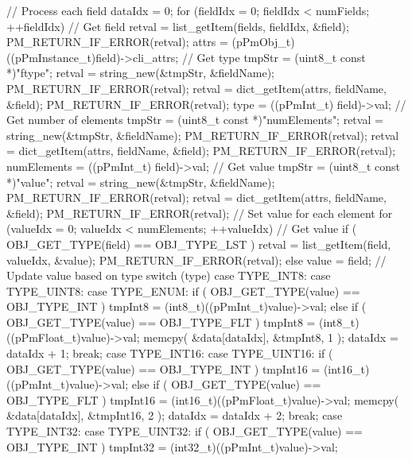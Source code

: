 \begin{DoxyVerb}
// Process each field
dataIdx = 0;
for (fieldIdx = 0; fieldIdx < numFields; ++fieldIdx)
{		
        // Get field
        retval = list_getItem(fields, fieldIdx, &field); PM_RETURN_IF_ERROR(retval);
        attrs = (pPmObj_t)((pPmInstance_t)field)->cli_attrs;
        // Get type
        tmpStr = (uint8_t const *)"ftype";
        retval = string_new(&tmpStr, &fieldName); PM_RETURN_IF_ERROR(retval); 
        retval = dict_getItem(attrs, fieldName, &field); PM_RETURN_IF_ERROR(retval);
        type = ((pPmInt_t) field)->val;   
        // Get number of elements
        tmpStr = (uint8_t const *)"numElements";
        retval = string_new(&tmpStr, &fieldName); PM_RETURN_IF_ERROR(retval); 
        retval = dict_getItem(attrs, fieldName, &field); PM_RETURN_IF_ERROR(retval);
        numElements = ((pPmInt_t) field)->val;
        // Get value
        tmpStr = (uint8_t const *)"value";
        retval = string_new(&tmpStr, &fieldName); PM_RETURN_IF_ERROR(retval); 
        retval = dict_getItem(attrs, fieldName, &field); PM_RETURN_IF_ERROR(retval); 
        // Set value for each element
        for (valueIdx = 0; valueIdx < numElements; ++valueIdx)
        {
// Get value
if ( OBJ_GET_TYPE(field) == OBJ_TYPE_LST )
{
        retval = list_getItem(field, valueIdx, &value); PM_RETURN_IF_ERROR(retval); 
}
else
        value = field;
// Update value based on type    
switch (type)  
{
        case TYPE_INT8: 
        case TYPE_UINT8:
        case TYPE_ENUM:       
                if ( OBJ_GET_TYPE(value) == OBJ_TYPE_INT )  
                {
                        tmpInt8 = (int8_t)((pPmInt_t)value)->val;
                }
                else if ( OBJ_GET_TYPE(value) == OBJ_TYPE_FLT )  
                {
                    tmpInt8 = (int8_t)((pPmFloat_t)value)->val;  
                } 
                memcpy( &data[dataIdx], &tmpInt8, 1 );
                dataIdx = dataIdx + 1;
                break;
        case TYPE_INT16:
        case TYPE_UINT16:
                if ( OBJ_GET_TYPE(value) == OBJ_TYPE_INT )  
                {
                        tmpInt16 = (int16_t)((pPmInt_t)value)->val;
                }
                else if ( OBJ_GET_TYPE(value) == OBJ_TYPE_FLT )  
                {
                    tmpInt16 = (int16_t)((pPmFloat_t)value)->val;  
                } 					
                memcpy( &data[dataIdx], &tmpInt16, 2 );
                dataIdx = dataIdx + 2;
                break;       
        case TYPE_INT32:
        case TYPE_UINT32:
                if ( OBJ_GET_TYPE(value) == OBJ_TYPE_INT )  
                {
                        tmpInt32 = (int32_t)((pPmInt_t)value)->val;
}}}}
\end{DoxyVerb}
